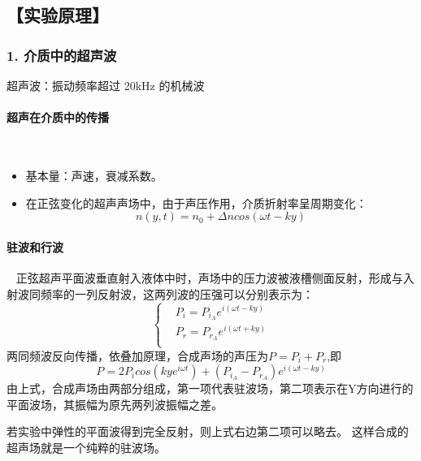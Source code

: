 \documentclass[12pt,a4paper,UTF8]{ctexart}
\begin{document}
\subsection*{【实验原理】}
\subsubsection*{1. 介质中的超声波}
超声波：振动频率超过 20kHz 的机械波
\paragraph*{超声在介质中的传播}~
    \newline
    \indent
    \begin{itemize}
			\item 基本量：声速，衰减系数。
			\item 在正弦变化的超声声场中，由于声压作用，介质折射率呈周期变化：
			\begin{equation}
			n(y,t)=n_0+\Delta n cos(\omega t-ky)
			\end{equation}
	\end{itemize}
\paragraph*{驻波和行波}~
    \newline
    \indent
	正弦超声平面波垂直射入液体中时，声场中的压力波被液槽侧面反射，形成与入射波同频率的一列反射波，这两列波的压强可以分别表示为：
	\begin{equation}
		\begin{cases}
			&P_i=P_{i_A}e^{i(\omega t-ky)} \\
			&P_r=P_{r_A}e^{i(\omega t+ky)}\\
		\end{cases}
	\end{equation}	
	两同频波反向传播，依叠加原理，合成声场的声压为$P=P_i+P_r$,即	
	\begin{equation}
		P=2P_icos(kye^{i\omega t})+(P_{i_A}-P_{r_A})e^{i(\omega t-ky)}
	\end{equation}
	由上式，合成声场由两部分组成，第一项代表驻波场，第二项表示在Y方向进行的平面波场，其振幅为原先两列波振幅之差。
	
	若实验中弹性的平面波得到完全反射，则上式右边第二项可以略去。
	这样合成的超声场就是一个纯粹的驻波场。
	
\end{document}
